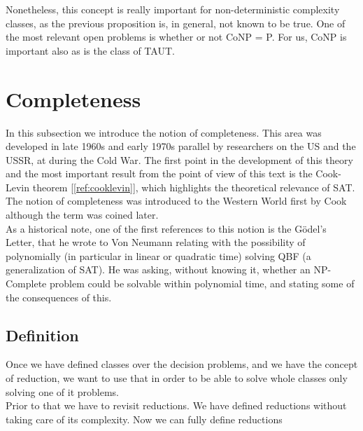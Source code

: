 Nonetheless, this concept is really important for non-deterministic complexity classes, as the previous proposition is, in general, not known to be true. One of the most relevant open problems is whether or not CoNP = P. For us, CoNP is important also as is the class of TAUT.



\section{Completeness}

In this subsection we introduce the notion of completeness. This area was developed in late 1960s and early 1970s parallel by researchers on the US and the USSR, at during the Cold War. The first point in the development  of this theory and the most important result from the point of view of this text is the Cook-Levin theorem [\ref{ref:cooklevin}], which highlights the theoretical relevance of SAT. The notion of completeness was introduced to the Western World first by Cook \cite{cook1971complexity} although the term was coined later. \\

As a historical note, one of the first references to this notion is the Gödel's Letter\cite{hartmanis1993godel}, that he wrote to Von Neumann relating with the possibility of polynomially (in particular in linear or quadratic time) solving QBF (a generalization of SAT). He was asking, without knowing it, whether an NP-Complete problem could be solvable within polynomial time, and stating some of the consequences of this.\\



\subsection{Definition}

Once we have defined classes over the decision problems, and we have the concept of reduction, we want to use that in order to be able to solve whole classes only solving one of it problems.\\

Prior to that we have to revisit reductions. We have defined reductions without taking care of its complexity. Now we can fully define reductions



